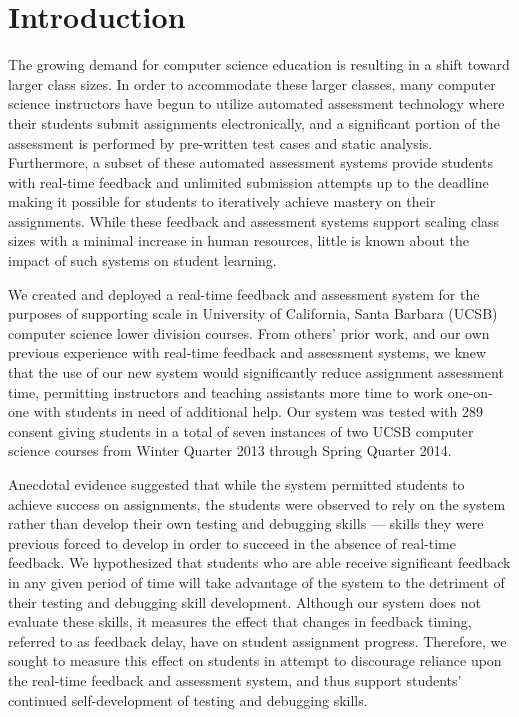 \section{Introduction}
The growing demand for computer science education is resulting in a shift
toward larger class sizes. In order to accommodate these larger classes, many
computer science instructors have begun to utilize automated assessment
technology where their students submit assignments electronically, and a
significant portion of the assessment is performed by pre-written test cases
and static analysis. Furthermore, a subset of these automated assessment
systems provide students with real-time feedback and unlimited submission
attempts up to the deadline making it possible for students to iteratively
achieve mastery on their assignments. While these feedback and assessment
systems support scaling class sizes with a minimal increase in human resources,
little is known about the impact of such systems on student learning.

We created and deployed a real-time feedback and assessment system for the
purposes of supporting scale in University of California, Santa Barbara (UCSB)
computer science lower division courses. From others' prior work, and our own
previous experience with real-time feedback and assessment systems, we knew
that the use of our new system would significantly reduce assignment assessment
time, permitting instructors and teaching assistants more time to work
one-on-one with students in need of additional help. Our system was tested with
289 consent giving students in a total of seven instances of two UCSB computer
science courses from Winter Quarter 2013 through Spring Quarter 2014.

Anecdotal evidence suggested that while the system permitted students to
achieve success on assignments, the students were observed to rely on the
system rather than develop their own testing and debugging skills --- skills
they were previous forced to develop in order to succeed in the absence of
real-time feedback. We hypothesized that students who are able receive
significant feedback in any given period of time will take advantage of the
system to the detriment of their testing and debugging skill
development. Although our system does not evaluate these skills, it measures
the effect that changes in feedback timing, referred to as feedback delay, have
on student assignment progress. Therefore, we sought to measure this effect on
students in attempt to discourage reliance upon the real-time feedback and
assessment system, and thus support students' continued self-development of
testing and debugging skills.

